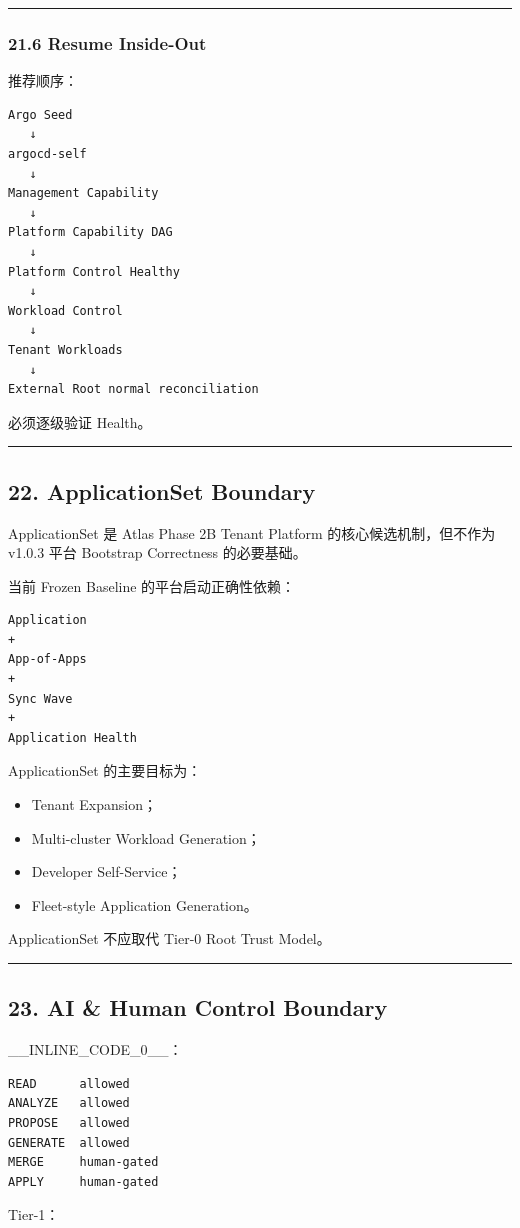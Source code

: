\documentclass[11pt,a4paper]{article}
\begin{document}
\vspace{0.5em}\hrule\vspace{0.5em}
\subsubsection{21.6 Resume Inside-Out}
推荐顺序：

\begin{lstlisting}[language=text]
Argo Seed
   ↓
argocd-self
   ↓
Management Capability
   ↓
Platform Capability DAG
   ↓
Platform Control Healthy
   ↓
Workload Control
   ↓
Tenant Workloads
   ↓
External Root normal reconciliation
\end{lstlisting}
必须逐级验证 Health。

\vspace{0.5em}\hrule\vspace{0.5em}
\subsection{22. ApplicationSet Boundary}
ApplicationSet 是 Atlas Phase 2B Tenant Platform 的核心候选机制，但不作为 v1.0.3 平台 Bootstrap Correctness 的必要基础。

当前 Frozen Baseline 的平台启动正确性依赖：

\begin{lstlisting}[language=text]
Application
+
App-of-Apps
+
Sync Wave
+
Application Health
\end{lstlisting}
ApplicationSet 的主要目标为：

\begin{itemize}
  \item Tenant Expansion；
  \item Multi-cluster Workload Generation；
  \item Developer Self-Service；
  \item Fleet-style Application Generation。
\end{itemize}
ApplicationSet 不应取代 Tier-0 Root Trust Model。

\vspace{0.5em}\hrule\vspace{0.5em}
\subsection{23. AI \& Human Control Boundary}
\_\_INLINE\_CODE\_0\_\_：

\begin{lstlisting}[language=text]
READ      allowed
ANALYZE   allowed
PROPOSE   allowed
GENERATE  allowed
MERGE     human-gated
APPLY     human-gated
\end{lstlisting}
Tier-1：
\end{document}
